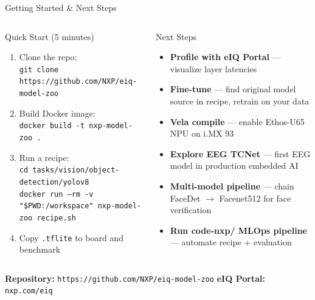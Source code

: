 \documentclass[aspectratio=169]{beamer}
\begin{document}
\begin{frame}{Getting Started \& Next Steps}
  \begin{columns}[T]
      \begin{block}{Quick Start (5 minutes)}
        \begin{enumerate}\small
          \item Clone the repo:
            \\\texttt{git clone https://github.com/NXP/eiq-model-zoo}
          \item Build Docker image:
            \\\texttt{docker build -t nxp-model-zoo .}
          \item Run a recipe:
            \\\texttt{cd tasks/vision/object-detection/yolov8}
            \\\texttt{docker run --rm -v "\$PWD:/workspace" nxp-model-zoo recipe.sh}
          \item Copy \texttt{.tflite} to board and benchmark
        \end{enumerate}
      \end{block}
      \begin{block}{Next Steps}
        \begin{itemize}\small
          \item \textbf{Profile with eIQ Portal} — visualize layer latencies
          \item \textbf{Fine-tune} — find original model source in recipe, retrain on your data
          \item \textbf{Vela compile} — enable Ethos-U65 NPU on i.MX 93
          \item \textbf{Explore EEG TCNet} — first EEG model in production embedded AI
          \item \textbf{Multi-model pipeline} — chain FaceDet $\to$ Facenet512 for face verification
          \item \textbf{Run code-nxp/ MLOps pipeline} — automate recipe + evaluation
        \end{itemize}
      \end{block}
  \end{columns}
  \vspace{8pt}
  \centering
  \textbf{Repository:} \texttt{https://github.com/NXP/eiq-model-zoo}
  \quad \textbf{eIQ Portal:} \texttt{nxp.com/eiq}
\end{frame}
\end{document}
